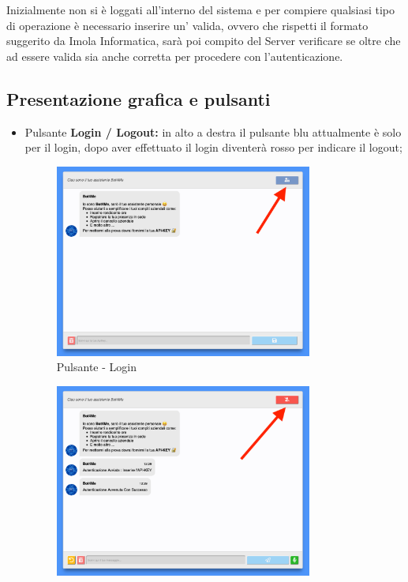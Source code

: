 Inizialmente non si è loggati all'interno del sistema e per compiere qualsiasi tipo di operazione è necessario inserire un' valida, ovvero che rispetti il formato suggerito da Imola Informatica, sarà poi compito del Server verificare se oltre che ad essere valida sia anche corretta per procedere con l'autenticazione. 

\subsection{Presentazione grafica e pulsanti}
\begin{itemize}
    \item Pulsante \textbf{Login / Logout:} in alto a destra il pulsante blu attualmente è solo per il login, dopo aver effettuato il login diventerà rosso per indicare il logout;
        \begin{figure}[H]
            \centering\includegraphics[width=0.8\textwidth, height=0.7\textheight, keepaspectratio]{images/schermata_pulsante_login.png}
            \caption{Pulsante - Login}
        \end{figure}
        \begin{figure}[H]
            \centering\includegraphics[width=0.8\textwidth, height=0.7\textheight, keepaspectratio]{images/schermata_pulsante_logout.png}

\end{figure}
\end{itemize}
